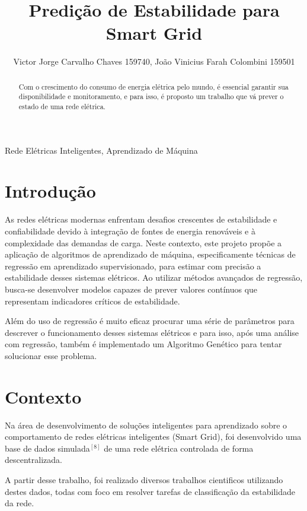 \documentclass[journal]{IEEEtran}
\title{Predição de Estabilidade para Smart Grid}
\author{Victor Jorge Carvalho Chaves 159740,
        João Vinicius Farah Colombini 159501}
\begin{document}
\maketitle

\begin{abstract}
    Com o crescimento do consumo de energia elétrica pelo mundo, é essencial garantir sua disponibilidade e monitoramento, e para isso, é proposto um trabalho que vá prever o estado de uma rede elétrica.
\end{abstract}

\begin{IEEEkeywords}
    Rede Elétricas Inteligentes, Aprendizado de Máquina
\end{IEEEkeywords}

\IEEEpeerreviewmaketitle

\section{Introdução}
As redes elétricas modernas enfrentam desafios crescentes de estabilidade e confiabilidade devido à integração de fontes de energia renováveis e à complexidade das demandas de carga. Neste contexto, este projeto propõe a aplicação de algoritmos de aprendizado de máquina, especificamente técnicas de regressão em aprendizado supervisionado, para estimar com precisão a estabilidade desses sistemas elétricos. Ao utilizar métodos avançados de regressão, busca-se desenvolver modelos capazes de prever valores contínuos que representam indicadores críticos de estabilidade.

Além do uso de regressão é muito eficaz procurar uma série de parâmetros para descrever o funcionamento desses sistemas elétricos e para  isso, após uma análise com regressão, também é implementado um Algoritmo Genético para tentar solucionar esse problema.

\section{Contexto}

Na área de desenvolvimento de soluções inteligentes para aprendizado sobre o comportamento de redes elétricas inteligentes (Smart Grid), foi desenvolvido uma base de dados simulada$^{[8]}$ de uma rede elétrica controlada de forma descentralizada.

A partir desse trabalho, foi realizado diversos trabalhos cientificos utilizando destes dados, todas com foco em resolver tarefas de classificação da estabilidade da rede.
\end{document}
